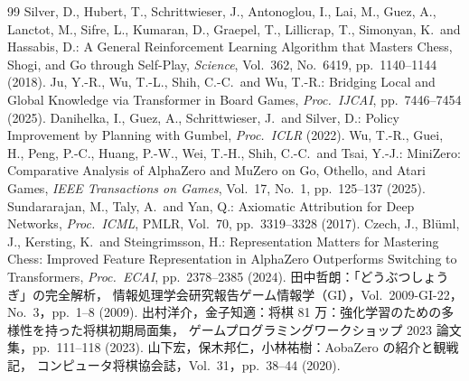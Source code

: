 \documentclass[submit]{ipsj}
\begin{document}
\begin{thebibliography}{99}
 Silver, D., Hubert, T., Schrittwieser, J., Antonoglou, I., Lai, M., Guez, A., Lanctot, M., Sifre, L.,
  Kumaran, D., Graepel, T., Lillicrap, T., Simonyan, K.\ and Hassabis, D.: A General Reinforcement Learning Algorithm that
  Masters Chess, Shogi, and Go through Self-Play, \textit{Science}, Vol.~362, No.~6419, pp.~1140--1144 (2018).
 Ju, Y.-R., Wu, T.-L., Shih, C.-C.\ and Wu, T.-R.: Bridging Local and
  Global Knowledge via Transformer in Board Games, \textit{Proc.\ IJCAI}, pp.~7446--7454 (2025).
 Danihelka, I., Guez, A., Schrittwieser, J.\ and Silver, D.: Policy
  Improvement by Planning with Gumbel, \textit{Proc.\ ICLR} (2022).
 Wu, T.-R., Guei, H., Peng, P.-C., Huang, P.-W., Wei, T.-H., Shih, C.-C.\ and Tsai, Y.-J.:
  MiniZero: Comparative Analysis of AlphaZero and MuZero on Go, Othello, and Atari Games,
  \textit{IEEE Transactions on Games}, Vol.~17, No.~1, pp.~125--137 (2025).
 Sundararajan, M., Taly, A.\ and Yan, Q.: Axiomatic Attribution for Deep Networks,
  \textit{Proc.\ ICML}, PMLR, Vol.~70, pp.~3319--3328 (2017).
 Czech, J., Bl\"{u}ml, J., Kersting, K.\ and Steingrimsson, H.: Representation Matters for Mastering Chess:
  Improved Feature Representation in AlphaZero Outperforms Switching to Transformers, \textit{Proc.\ ECAI}, pp.~2378--2385 (2024).
 田中哲朗：「どうぶつしょうぎ」の完全解析，
  情報処理学会研究報告ゲーム情報学（GI），Vol.~2009-GI-22，No.~3，pp.~1--8 (2009).
 出村洋介，金子知適：将棋 81 万：強化学習のための多様性を持った将棋初期局面集，
  ゲームプログラミングワークショップ 2023 論文集，pp.~111--118 (2023).
 山下宏，保木邦仁，小林祐樹：AobaZero の紹介と観戦記，
  コンピュータ将棋協会誌，Vol.~31，pp.~38--44 (2020).
\end{thebibliography}
\end{document}
